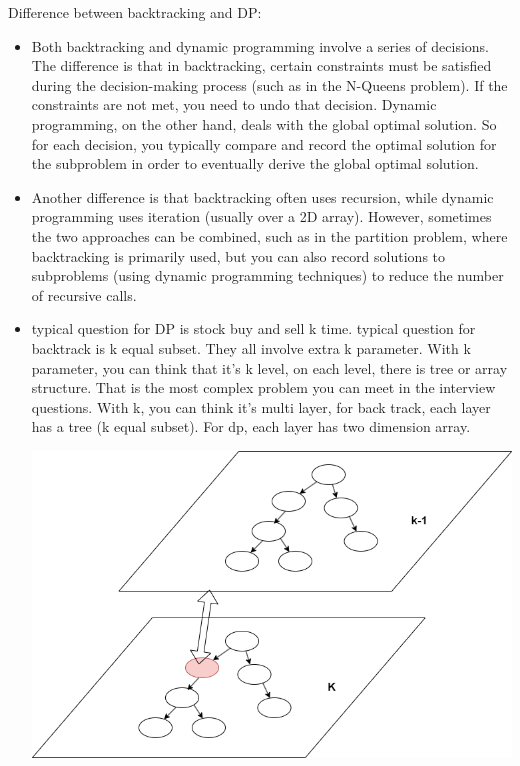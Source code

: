 \documentclass[a4paper,11pt,twoside]{book}
\begin{document}
	\par Difference between backtracking and DP:
	\begin{itemize}
		\item Both backtracking and dynamic programming involve a series of decisions. The difference is that in backtracking, certain constraints must be satisfied during the decision-making process (such as in the N-Queens problem). If the constraints are not met, you need to undo that decision. Dynamic programming, on the other hand, deals with the global optimal solution. So for each decision, you typically compare and record the optimal solution for the subproblem in order to eventually derive the global optimal solution.
		
		\item Another difference is that backtracking often uses recursion, while dynamic programming uses iteration (usually over a 2D array). However, sometimes the two approaches can be combined, such as in the partition problem, where backtracking is primarily used, but you can also record solutions to subproblems (using dynamic programming techniques) to reduce the number of recursive calls.
		
		\item typical question for DP is stock buy and sell k time.  typical question for backtrack is k equal subset. They all involve extra k parameter. With k parameter, you can think that it's k level, on each level, there is tree or array structure. That is the most complex problem you can meet in the interview questions. With k, you can think it's multi layer, for back track, each layer has a tree (k equal subset). For dp, each layer has two dimension array.

\begin{center}
	\includegraphics[scale=0.45]{pics/dp_back.drawio.png}
\end{center}

		
	\end{itemize}
	
\end{document}
